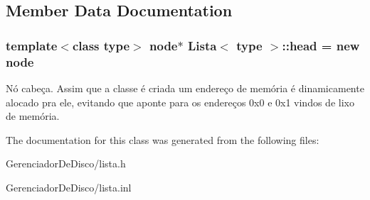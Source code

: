 \subsection{Member Data Documentation}
\hypertarget{classLista_acc29e448aa48540bb4f070661a52bc60}{}
\subsubsection[{head}]{\setlength{\rightskip}{0pt plus 5cm}template$<$class type$>$ {\bf node}$\ast$ {\bf Lista}$<$ type $>$\+::head = new {\bf node}}\label{classLista_acc29e448aa48540bb4f070661a52bc60}
Nó cabeça. Assim que a classe é criada um endereço de memória é dinamicamente alocado pra ele, evitando que aponte para os endereços 0x0 e 0x1 vindos de lixo de memória. 

The documentation for this class was generated from the following files\+:\begin{DoxyCompactItemize}
\item 
Gerenciador\+De\+Disco/lista.\+h\item 
Gerenciador\+De\+Disco/lista.\+inl\end{DoxyCompactItemize}
